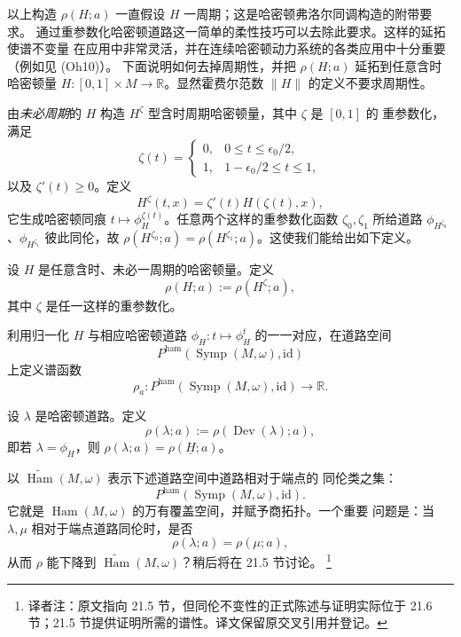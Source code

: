 以上构造 $\rho(H;a)$ 一直假设 $H$ 一周期；这是哈密顿弗洛尔同调构造的附带要求。
通过重参数化哈密顿道路这一简单的柔性技巧可以去除此要求。这样的延拓使谱不变量
在应用中非常灵活，并在连续哈密顿动力系统的各类应用中十分重要（例如见 (Oh10)）。
下面说明如何去掉周期性，并把 $\rho(H;a)$ 延拓到任意含时哈密顿量
$H:[0,1]\times M\to\mathbb R$。显然霍费尔范数 $\lVert H\rVert$ 的定义不要求周期性。

由\emph{未必周期}的 $H$ 构造 $H^\zeta$ 型含时周期哈密顿量，其中 $\zeta$ 是 $[0,1]$ 的
重参数化，满足
\begin{equation}
 \zeta(t)=
 \begin{cases}
 0,&0\leq t\leq\epsilon_0/2,\\
 1,&1-\epsilon_0/2\leq t\leq1,
 \end{cases}
 \label{eq:21-reparameterization-cutoff}
\end{equation}
以及 $\zeta'(t)\geq0$。定义
\[
 H^\zeta(t,x)=\zeta'(t)H(\zeta(t),x),
\]
它生成哈密顿同痕 $t\mapsto\phi_H^{\zeta(t)}$。任意两个这样的重参数化函数
$\zeta_0,\zeta_1$ 所给道路 $\phi_{H^{\zeta_0}}$、$\phi_{H^{\zeta_1}}$ 彼此同伦，故
$\rho(H^{\zeta_0};a)=\rho(H^{\zeta_1};a)$。这使我们能给出如下定义。

\begin{definition}
\label{def:21-nonperiodic-spectral-invariant}
设 $H$ 是任意含时、未必一周期的哈密顿量。定义
\begin{equation}
 \rho(H;a):=\rho(H^\zeta;a),
 \label{eq:21-nonperiodic-spectral-definition}
\end{equation}
其中 $\zeta$ 是任一这样的重参数化。
\end{definition}

利用归一化 $H$ 与相应哈密顿道路 $\phi_H:t\mapsto\phi_H^t$ 的一一对应，在道路空间
\[
 P^{\mathrm{ham}}(\operatorname{Symp}(M,\omega),\mathrm{id})
\]
上定义谱函数
\[
 \rho_a:P^{\mathrm{ham}}(\operatorname{Symp}(M,\omega),\mathrm{id})
 \longrightarrow\mathbb R.
\]

\begin{definition}[哈密顿道路的谱不变量]
\label{def:21-hamiltonian-path-spectral-invariant}
设 $\lambda$ 是哈密顿道路。定义
\[
 \rho(\lambda;a):=\rho(\operatorname{Dev}(\lambda);a),
\]
即若 $\lambda=\phi_H$，则 $\rho(\lambda;a)=\rho(\underline H;a)$。
\end{definition}

以 $\widetilde{\operatorname{Ham}}(M,\omega)$ 表示下述道路空间中道路相对于端点的
同伦类之集：
\[
 P^{\mathrm{ham}}(\operatorname{Symp}(M,\omega),\mathrm{id}).
\]
它就是 $\operatorname{Ham}(M,\omega)$ 的万有覆盖空间，并赋予商拓扑。一个重要
问题是：当 $\lambda,\mu$ 相对于端点道路同伦时，是否
\[
 \rho(\lambda;a)=\rho(\mu;a),
\]
从而 $\rho$ 能下降到 $\widetilde{\operatorname{Ham}}(M,\omega)$？稍后将在 21.5 节讨论。
\footnote{译者注：原文指向 21.5 节，但同伦不变性的正式陈述与证明实际位于
21.6 节；21.5 节提供证明所需的谱性。译文保留原交叉引用并登记。}
